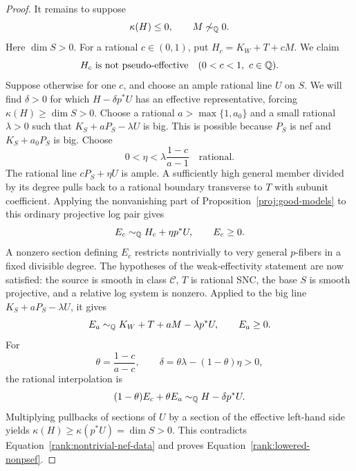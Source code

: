 \begin{proof}
It remains to suppose
\begin{equation}
                    \kappa(H)\leq0,\qquad M\not\sim_{\mathbb Q}0.
\label{rank:nontrivial-nef-data}
\end{equation}
Here \(\dim S>0\).  For a rational \(c\in(0,1)\), put
\(H_c=K_W+T+cM\).  We claim
\begin{equation}
                   H_c\ \text{is not pseudo-effective}
                   \quad(0<c<1,\ c\in\mathbb Q).
\label{rank:lowered-nonpsef}
\end{equation}
Suppose otherwise for one \(c\), and choose an ample rational line \(U\)
on \(S\).  We will find \(\delta>0\) for which \(H-\delta p^*U\) has an
effective representative, forcing \(\kappa(H)\geq\dim S>0\).
Choose a rational \(a>\max\{1,a_0\}\) and a small
rational \(\lambda>0\) such that \(K_S+aP_S-\lambda U\) is big.
This is possible because \(P_S\) is nef and
\(K_S+a_0P_S\) is big.  Choose
\[
                   0<\eta<\lambda\frac{1-c}{a-1}
                   \quad\text{rational}.
\]
The rational line \(cP_S+\eta U\) is ample.  A sufficiently high
general member divided by its degree pulls back to a rational
boundary transverse to \(T\) with subunit coefficient.  Applying
the nonvanishing part of Proposition~\ref{proj:good-models} to
this ordinary projective log pair gives
\[
                 E_c\sim_{\mathbb Q}H_c+\eta p^*U,\qquad E_c\geq0.
\]
A nonzero section defining \(E_c\) restricts nontrivially to very
general \(p\)-fibers in a fixed divisible degree.  The hypotheses
of the weak-effectivity statement \cite[Lemma~3.3]{CI} are now
satisfied: the source is smooth in class \(\mathcal C\), \(T\)
is rational SNC, the base \(S\) is smooth projective, and a
relative log system is nonzero.  Applied to the big line
\(K_S+aP_S-\lambda U\), it gives
\[
                 E_a\sim_{\mathbb Q}K_W+T+aM-\lambda p^*U,\qquad E_a\geq0.
\]
For
\[
 \theta=\frac{1-c}{a-c},\qquad
 \delta=\theta\lambda-(1-\theta)\eta>0,
\]
the rational interpolation is
\[
          (1-\theta)E_c+\theta E_a
                    \sim_{\mathbb Q}H-\delta p^*U.
\]
Multiplying pullbacks of sections of \(U\) by a section of the
effective left-hand side yields
\(\kappa(H)\geq\kappa(p^*U)=\dim S>0\).
This contradicts Equation~\eqref{rank:nontrivial-nef-data} and
proves Equation~\eqref{rank:lowered-nonpsef}.


\end{proof}
